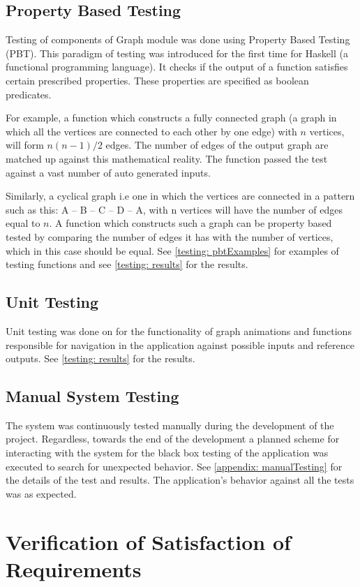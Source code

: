 \subsection{Property Based Testing}
Testing of components of Graph module was done using Property Based Testing (PBT).
This paradigm of testing was introduced for the first time for Haskell (a
functional programming language). It checks if the output of a function
satisfies certain prescribed properties. These properties are specified as
boolean predicates.

For example, a function which constructs a fully connected graph (a graph in
which all the vertices are connected to each other by one edge) with $n$
vertices, will form $n (n - 1) / 2$ edges. The number of edges of the output
graph are matched up against this mathematical reality. The function passed
the test against a vast number of auto generated inputs.

Similarly, a cyclical graph i.e one in which the vertices are connected in a
pattern such as this: A -- B -- C -- D -- A, with n vertices will have the
number of edges equal to $n$. A function which constructs such a graph can be
property based tested by comparing the number of edges it has with the number
of vertices, which in this case should be equal. See \autoref{testing: pbtExamples}
for examples of testing functions and see \autoref{testing: results} for the results.

\subsection{Unit Testing}
Unit testing was done on for the functionality of graph animations and
functions responsible for navigation in the application against possible inputs
and reference outputs. See \autoref{testing: results} for the results.

\subsection{Manual System Testing}
The system was continuously tested manually during the development of the
project. Regardless, towards the end of the development a planned scheme for
interacting with the system for the black box testing of the application was
executed to search for unexpected behavior. See \autoref{appendix:
manualTesting} for the details of the test and results. The application's
behavior against all the tests was as expected.

\section{Verification of Satisfaction of Requirements}

